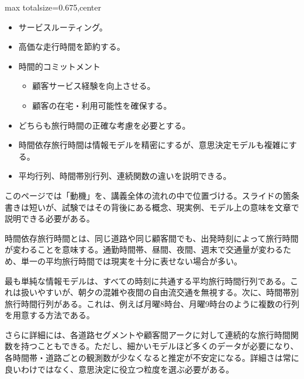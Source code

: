 \clearpage
{}
\begin{adjustbox}{max totalsize={\textwidth}{0.675\textheight},center}
\begin{minipage}{\textwidth}\scriptsize
\begin{minipage}[t]{0.485\textwidth}
\begin{itemize}
\item サービスルーティング。
\item 高価な走行時間を節約する。
\item 時間的コミットメント
\begin{itemize}
\item 顧客サービス経験を向上させる。
\item 顧客の在宅・利用可能性を確保する。
\end{itemize}
\item どちらも旅行時間の正確な考慮を必要とする。
\end{itemize}
\begin{itemize}
\item 時間依存旅行時間は情報モデルを精密にするが、意思決定モデルも複雑にする。
\item 平均行列、時間帯別行列、連続関数の違いを説明できる。
\end{itemize}
\end{minipage}\hfill
\begin{minipage}[t]{0.485\textwidth}
このページでは「動機」を、講義全体の流れの中で位置づける。スライドの箇条書きは短いが、試験ではその背後にある概念、現実例、モデル上の意味を文章で説明できる必要がある。\par
時間依存旅行時間とは、同じ道路や同じ顧客間でも、出発時刻によって旅行時間が変わることを意味する。通勤時間帯、昼間、夜間、週末で交通量が変わるため、単一の平均旅行時間では現実を十分に表せない場合が多い。\par
最も単純な情報モデルは、すべての時刻に共通する平均旅行時間行列である。これは扱いやすいが、朝夕の混雑や夜間の自由流交通を無視する。次に、時間帯別旅行時間行列がある。これは、例えば月曜8時台、月曜9時台のように複数の行列を用意する方法である。\par
さらに詳細には、各道路セグメントや顧客間アークに対して連続的な旅行時間関数を持つこともできる。ただし、細かいモデルほど多くのデータが必要になり、各時間帯・道路ごとの観測数が少なくなると推定が不安定になる。詳細さは常に良いわけではなく、意思決定に役立つ粒度を選ぶ必要がある。\par

\end{minipage}
\end{minipage}
\end{adjustbox}
